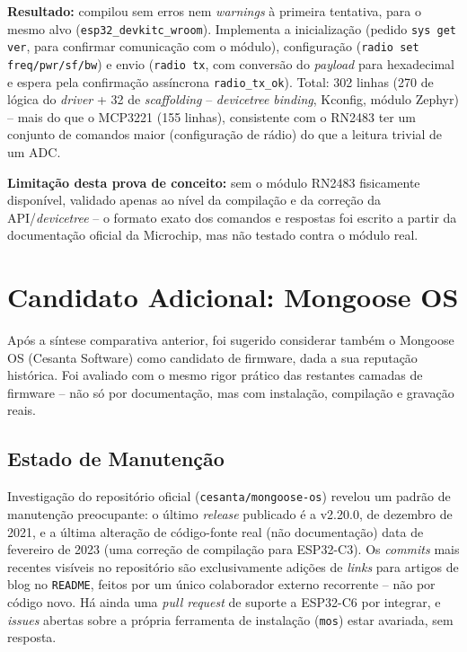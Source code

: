 \documentclass[a4paper,12pt]{article}
\begin{document}
\textbf{Resultado:} compilou sem erros nem \textit{warnings} à primeira tentativa, para o mesmo alvo (\texttt{esp32\_devkitc\_wroom}). Implementa a inicialização (pedido \texttt{sys get ver}, para confirmar comunicação com o módulo), configuração (\texttt{radio set freq/pwr/sf/bw}) e envio (\texttt{radio tx}, com conversão do \textit{payload} para hexadecimal e espera pela confirmação assíncrona \texttt{radio\_tx\_ok}). Total: 302 linhas (270 de lógica do \textit{driver} + 32 de \textit{scaffolding} -- \textit{devicetree binding}, Kconfig, módulo Zephyr) -- mais do que o MCP3221 (155 linhas), consistente com o RN2483 ter um conjunto de comandos maior (configuração de rádio) do que a leitura trivial de um ADC.

\textbf{Limitação desta prova de conceito:} sem o módulo RN2483 fisicamente disponível, validado apenas ao nível da compilação e da correção da API/\textit{devicetree} -- o formato exato dos comandos e respostas foi escrito a partir da documentação oficial da Microchip, mas não testado contra o módulo real.

\section{Candidato Adicional: Mongoose OS}
Após a síntese comparativa anterior, foi sugerido considerar também o Mongoose OS (Cesanta Software) como candidato de firmware, dada a sua reputação histórica. Foi avaliado com o mesmo rigor prático das restantes camadas de firmware -- não só por documentação, mas com instalação, compilação e gravação reais.

\subsection{Estado de Manutenção}
Investigação do repositório oficial (\texttt{cesanta/mongoose-os}) revelou um padrão de manutenção preocupante: o último \textit{release} publicado é a v2.20.0, de dezembro de 2021, e a última alteração de código-fonte real (não documentação) data de fevereiro de 2023 (uma correção de compilação para ESP32-C3). Os \textit{commits} mais recentes visíveis no repositório são exclusivamente adições de \textit{links} para artigos de blog no \texttt{README}, feitos por um único colaborador externo recorrente -- não por código novo. Há ainda uma \textit{pull request} de suporte a ESP32-C6 por integrar, e \textit{issues} abertas sobre a própria ferramenta de instalação (\texttt{mos}) estar avariada, sem resposta.
\end{document}
